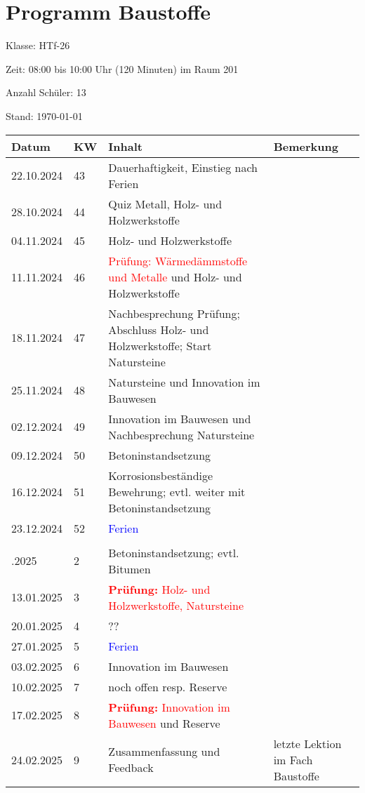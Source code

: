 \documentclass[
11pt,
captions=tableheading,
headings=big,
headsepline,
footsepline, 
captions=tableheading,
parskip=half-,
]{scrartcl}
\title{\fach}
\date{2024}
\newcommand{\klasse}{HTf-26\xspace}
\newcommand{\red}[1]{\textcolor{red}{#1}}
\begin{document}
\section*{Programm Baustoffe}

Klasse: \klasse

Zeit: 08:00 bis 10:00 Uhr (120 Minuten) im Raum 201

Anzahl Schüler: 13



Stand: \today

\vspace{0.75cm}



\begin{table}[H]
    \centering
    \begin{tabular}{llp{8.5cm}p{3.5cm}}
    \toprule
    Datum & KW  & Inhalt & Bemerkung \\
    \midrule
        22.10.2024 & 43 & Dauerhaftigkeit, Einstieg nach Ferien & {} \\
        28.10.2024 & 44 & Quiz Metall, Holz- und Holzwerkstoffe& {} \\
        04.11.2024 & 45 & Holz- und Holzwerkstoffe & {} \\
        11.11.2024 & 46 & \red{Prüfung: Wärmedämmstoffe und Metalle} und Holz- und Holzwerkstoffe & {} \\
        18.11.2024 & 47 & Nachbesprechung Prüfung; Abschluss Holz- und Holzwerkstoffe; Start Natursteine& {} \\
        25.11.2024 & 48 & Natursteine  und Innovation im Bauwesen & {} \\
        02.12.2024 & 49 & Innovation im Bauwesen und Nachbesprechung Natursteine& {} \\
        09.12.2024 & 50 & Betoninstandsetzung & {} \\
        16.12.2024 & 51 & Korrosionsbeständige Bewehrung; evtl. weiter mit Betoninstandsetzung & {} \\
        23.12.2024 & 52 & \textcolor{blue}{Ferien} & {} \\
        \midrule
        \\ \addlinespace
        \midrule
        06.01.2025 & 2 & Betoninstandsetzung; evtl. Bitumen & {} \\
        13.01.2025 & 3 &  \red{\textbf{Prüfung:} Holz- und Holzwerkstoffe, Natursteine}  & {} \\
        20.01.2025 & 4 & ?? & {} \\
        27.01.2025 & 5 & \textcolor{blue}{Ferien} & {} \\
        03.02.2025 & 6 & Innovation im Bauwesen & {} \\
        10.02.2025 & 7 & noch offen resp. Reserve & {} \\
        17.02.2025 & 8 & \red{\textbf{Prüfung:} Innovation im Bauwesen} und Reserve & {} \\
        24.02.2025 & 9 & Zusammenfassung und Feedback & letzte Lektion im Fach Baustoffe\\
    \bottomrule
    \end{tabular}
\end{table}
\end{document}
